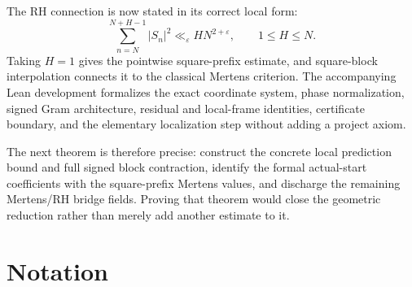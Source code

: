 \documentclass[11pt]{article}
\theoremstyle{definition}
\theoremstyle{remark}
\newcommand{\eps}{\varepsilon}
\newcommand{\1}{\mathbf{1}}
\begin{document}
The RH connection is now stated in its correct local form:
\[
 \sum_{n=N}^{N+H-1}|S_n|^2\ll_\eps HN^{2+\eps},
 \qquad 1\le H\le N.
\]
Taking $H=1$ gives the pointwise square-prefix estimate, and square-block interpolation connects it to the classical Mertens criterion.  The accompanying Lean development formalizes the exact coordinate system, phase normalization, signed Gram architecture, residual and local-frame identities, certificate boundary, and the elementary localization step without adding a project axiom.

The next theorem is therefore precise: construct the concrete local prediction bound and full signed block contraction, identify the formal actual-start coefficients with the square-prefix Mertens values, and discharge the remaining Mertens/RH bridge fields.  Proving that theorem would close the geometric reduction rather than merely add another estimate to it.

\appendix
\section{Notation}
\end{document}
